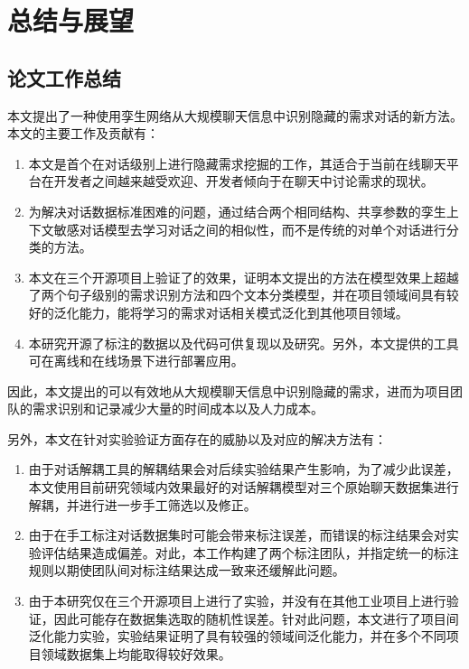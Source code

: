 \chapter{总结与展望}
\section{论文工作总结}
本文提出了一种使用孪生网络从大规模聊天信息中识别隐藏的需求对话的新方法{\tool}。本文的主要工作及贡献有：
\begin{enumerate}
    \item 本文是首个在对话级别上进行隐藏需求挖掘的工作，其适合于当前在线聊天平台在开发者之间越来越受欢迎、开发者倾向于在聊天中讨论需求的现状。
    \item 为解决对话数据标准困难的问题，{\tool}通过结合两个相同结构、共享参数的孪生上下文敏感对话模型{\dm}去学习对话之间的相似性，而不是传统的对单个对话进行分类的方法。
    \item 本文在三个开源项目上验证了{\tool}的效果，证明本文提出的方法在模型效果上超越了两个句子级别的需求识别方法和四个文本分类模型，并在项目领域间具有较好的泛化能力，能将学习的需求对话相关模式泛化到其他项目领域。
    \item 本研究开源了标注的数据以及代码可供复现以及研究。另外，本文提供的{\tool}工具可在离线和在线场景下进行部署应用。
\end{enumerate}

因此，本文提出的{\tool}可以有效地从大规模聊天信息中识别隐藏的需求，进而为项目团队的需求识别和记录减少大量的时间成本以及人力成本。

另外，本文在针对实验验证方面存在的威胁以及对应的解决方法有：
\begin{enumerate}
    \item 由于对话解耦工具的解耦结果会对后续实验结果产生影响，为了减少此误差，本文使用目前研究领域内效果最好的对话解耦模型对三个原始聊天数据集进行解耦，并进行进一步手工筛选以及修正。
    \item 由于在手工标注对话数据集时可能会带来标注误差，而错误的标注结果会对实验评估结果造成偏差。对此，本工作构建了两个标注团队，并指定统一的标注规则以期使团队间对标注结果达成一致来还缓解此问题。
    \item 由于本研究仅在三个开源项目上进行了实验，并没有在其他工业项目上进行验证，因此可能存在数据集选取的随机性误差。针对此问题，本文进行了项目间泛化能力实验，实验结果证明了{\tool}具有较强的领域间泛化能力，并在多个不同项目领域数据集上均能取得较好效果。
\end{enumerate}






